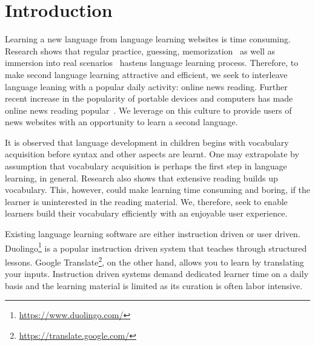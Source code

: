\section{Introduction}
Learning a new language from language learning websites is 
time consuming. Research shows that regular practice, guessing, 
memorization~\cite{rubin91} as well as immersion into real scenarios~\cite{naiman78} hastens language learning process. 
Therefore, to make second language learning 
attractive and efficient, we seek to interleave language leaning 
with a popular daily activity: online news reading.
Further recent increase in the popularity of 
portable devices and computers has made online news reading popular~\cite{yarlh2012}. 
We leverage on this culture to provide users of news websites with an opportunity to learn a second language.

It is observed that language development in children begins with 
vocabulary acquisition before syntax and other aspects are learnt. One may 
extrapolate by assumption that vocabulary acquisition is perhaps the first step in language learning, in general. Research also shows that extensive reading builds up vocabulary. This, however, could make learning time consuming and boring, if the learner is uninterested in the reading material. We, therefore, seek to enable learners build 
their vocabulary efficiently with an enjoyable user experience.

Existing language learning software are either instruction driven or user driven. 
Duolingo\footnote{\url{https://www.duolingo.com/}} is a popular instruction driven system that teaches through structured lessons. Google Translate\footnote{\url{https://translate.google.com/}}, on the other hand, allows you to learn by translating your inputs. Instruction driven systems demand dedicated learner time on a daily basis and
 the learning material is  limited as its curation is often labor intensive.

